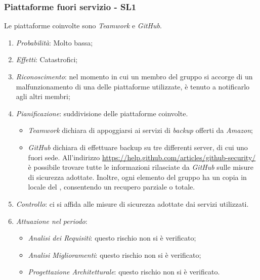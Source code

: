 \subsubsection{Piattaforme fuori servizio - SL1}
Le piattaforme coinvolte sono \textit{Teamwork} e \textit{GitHub}.
\begin{enumerate}
\item \textit{Probabilit\`a}: Molto bassa;
\item \textit{Effetti}: Catastrofici;
\item \textit{Riconoscimento}: nel momento in cui un membro del gruppo si accorge di un malfunzionamento di una delle piattaforme utilizzate, è tenuto a notificarlo agli altri membri;
\item \textit{Pianificazione}: suddivisione delle piattaforme coinvolte.
  \begin{itemize}
    \item \textit{Teamwork} dichiara di appoggiarsi ai servizi di \textit{backup} offerti da \textit{Amazon};
    \item \textit{GitHub} dichiara di effettuare backup su tre differenti server, di cui uno fuori sede. All'indirizzo \href{https://help.github.com/articles/github-security/}{https://help.github.com/articles/github-security/} \`e possibile trovare tutte le informazioni rilasciate da \textit{GitHub} sulle misure di sicurezza adottate. Inoltre, ogni elemento del gruppo ha un copia in locale del , consentendo un recupero parziale o totale.
  \end{itemize}
\item \textit{Controllo}: ci si affida alle misure di sicurezza adottate dai servizi utilizzati.
\item \textit{Attuazione nel periodo}: 
	\begin{itemize}
	\item \textit{Analisi dei Requisiti}: questo rischio non si è verificato;
	\item \textit{Analisi Miglioramenti}: questo rischio non si è verificato;
	\item \textit{Progettazione Architetturale}: questo rischio non si è verificato.
	\end{itemize}
\end{enumerate}

